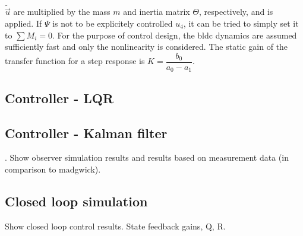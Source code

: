 $\tilde{\vec{u}}$ are multiplied by the mass $m$ and inertia matrix $\Theta$, respectively, and  is applied. If $\Psi$ is not to be explicitely controlled $u_4$, it can be tried to simply set it to $\sum M_i = 0$.
For the purpose of control design, the bldc dynamics are assumed sufficiently fast and only the nonlinearity is considered. The static gain of the transfer function for a step response is $K = \dfrac{b_0}{a_0 - a_1}$.
\clearpage

\subsection{Controller - LQR}

\clearpage

\subsection{Controller - Kalman filter}
. 
Show observer simulation results and results based on measurement data (in comparison to madgwick).
\clearpage

\subsection{Closed loop simulation}
 Show closed loop control results. State feedback gains, Q, R. 